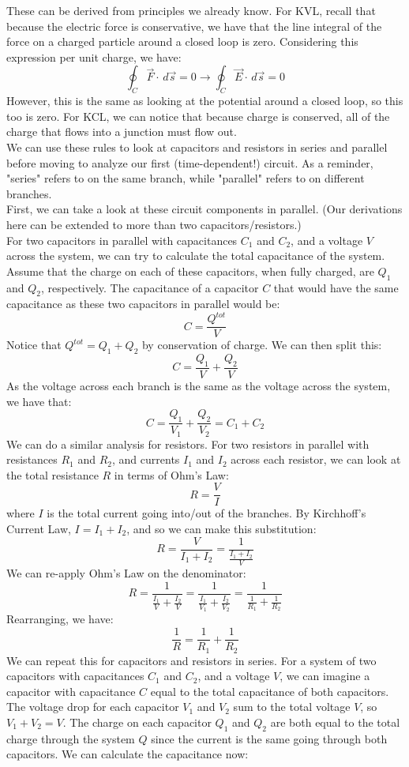 These can be derived from principles we already know. For KVL, recall that because the electric force is conservative, we have that the line integral of the force on a charged particle around a closed loop is zero. Considering this expression per unit charge, we have:
\[
	\oint_C \vec F \cdot \, d\vec s = 0 \rightarrow \oint_C \vec E \cdot \, d\vec s = 0
\]
However, this is the same as looking at the potential around a closed loop, so this too is zero. For KCL, we can notice that because charge is conserved, all of the charge that flows into a junction must flow out. \\
We can use these rules to look at capacitors and resistors in series and parallel before moving to analyze our first (time-dependent!) circuit. As a reminder, "series" refers to on the same branch, while "parallel" refers to on different branches. \\
First, we can take a look at these circuit components in parallel. (Our derivations here can be extended to more than two capacitors/resistors.)\\
For two capacitors in parallel with capacitances $C_1$ and $C_2$, and a voltage $V$ across the system, we can try to calculate the total capacitance of the system. Assume that the charge on each of these capacitors, when fully charged, are $Q_1$ and $Q_2$, respectively. The capacitance of a capacitor $C$ that would have the same capacitance as these two capacitors in parallel would be:
\[
	C = \frac {Q^{tot}}{V}
\]
Notice that $Q^{tot} = Q_1 + Q_2$ by conservation of charge. We can then split this:
\[
	C = \frac{Q_1}{V} + \frac{Q_2}{V}
\]
As the voltage across each branch is the same as the voltage across the system, we have that:
\[
	C = \frac{Q_1}{V_1} + \frac{Q_2}{V_2} = C_1 + C_2
\]
We can do a similar analysis for resistors. For two resistors in parallel with resistances $R_1$ and $R_2$, and currents $I_1$ and $I_2$ across each resistor, we can look at the total resistance $R$ in terms of Ohm's Law:
\[
	R = \frac{V}{I}
\]
where $I$ is the total current going into/out of the branches. By Kirchhoff's Current Law, $I = I_1 + I_2$, and so we can make this substitution:
\[
	R = \frac{V}{I_1 + I_2} = \frac{1}{\frac{I_1+I_2}{V}}
\]
We can re-apply Ohm's Law on the denominator:
\[
	R = \frac{1}{\frac{I_1}{V} + \frac{I_2}{V}} = \frac{1}{\frac{I_1}{V_1} + \frac{I_2}{V_2}} = \frac{1}{\frac{1}{R_1} + \frac{1}{R_2}}
\]
Rearranging, we have:
\[
	\frac{1}{R} = \frac{1}{R_1} + \frac{1}{R_2}
\]
We can repeat this for capacitors and resistors in series. For a system of two capacitors with capacitances $C_1$ and $C_2$, and a voltage $V$, we can imagine a capacitor with capacitance $C$ equal to the total capacitance of both capacitors. The voltage drop for each capacitor $V_1$ and $V_2$ sum to the total voltage $V$, so $V_1 + V_2 = V$. The charge on each capacitor $Q_1$ and $Q_2$ are both equal to the total charge through the system $Q$ since the current is the same going through both capacitors. We can calculate the capacitance now:
